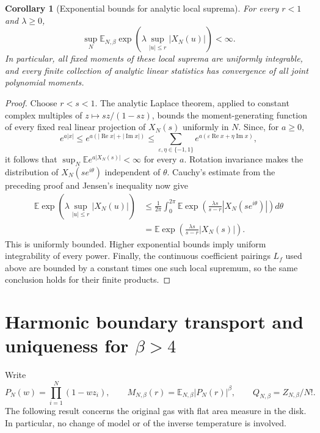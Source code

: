 \documentclass[11pt,a4paper]{article}
\numberwithin{equation}{section}
\newtheorem{corollary}[theorem]{Corollary}
\theoremstyle{definition}
\theoremstyle{remark}
\begin{document}
\begin{corollary}[Exponential bounds for analytic local suprema]
\label{cor:analytic-supremum-exponential}
For every $r<1$ and $\lambda\geq0$,
\[
 \sup_N\mathbb E_{N,\beta}
       \exp\left(\lambda\sup_{|u|\leq r}|X_N(u)|\right)<\infty.
\]
In particular, all fixed moments of these local suprema are uniformly
integrable, and every finite collection of analytic linear statistics
has convergence of all joint polynomial moments.
\end{corollary}

\begin{proof}
Choose $r<s<1$. The analytic Laplace theorem, applied to constant complex
multiples of $z\mapsto sz/(1-sz)$, bounds the moment-generating function
of every fixed real linear projection of $X_N(s)$ uniformly in $N$.
Since, for $a\geq0$,
\[
 e^{a|x|}\leq e^{a(|\operatorname{Re}x|+|\operatorname{Im}x|)}
 \leq\sum_{\varepsilon,\eta\in\{-1,1\}}
       e^{a(\varepsilon\operatorname{Re}x+\eta\operatorname{Im}x)},
\]
it follows that $\sup_N\mathbb E e^{a|X_N(s)|}<\infty$ for every $a$.
Rotation invariance makes the distribution of $X_N(se^{i\theta})$
independent of $\theta$. Cauchy's estimate from the preceding proof and
Jensen's inequality now give
\begin{align*}
 \mathbb E\exp\left(\lambda\sup_{|u|\leq r}|X_N(u)|\right)
 &\leq\frac1{2\pi}\int_0^{2\pi}
       \mathbb E\exp\left(\frac{\lambda s}{s-r}
                           |X_N(se^{i\theta})|\right)d\theta\\
 &=\mathbb E\exp\left(\frac{\lambda s}{s-r}|X_N(s)|\right).
\end{align*}
This is uniformly bounded. Higher exponential bounds imply uniform
integrability of every power. Finally, the continuous coefficient
pairings $L_f$ used above are bounded by a constant times one such local
supremum, so the same conclusion holds for their finite products.
\end{proof}

\section{Harmonic boundary transport and uniqueness for \texorpdfstring{$\beta>4$}{beta greater than 4}}
\label{sec:harmonic-boundary-breakthrough}

Write
\[
 P_N(w)=\prod_{i=1}^N(1-wz_i),\qquad
 M_{N,\beta}(r)=\mathbb E_{N,\beta}|P_N(r)|^\beta,
 \qquad Q_{N,\beta}=Z_{N,\beta}/N!.
\]
The following result concerns the original gas with flat area measure in
the disk. In particular, no change of model or of the inverse temperature
is involved.
\end{document}
